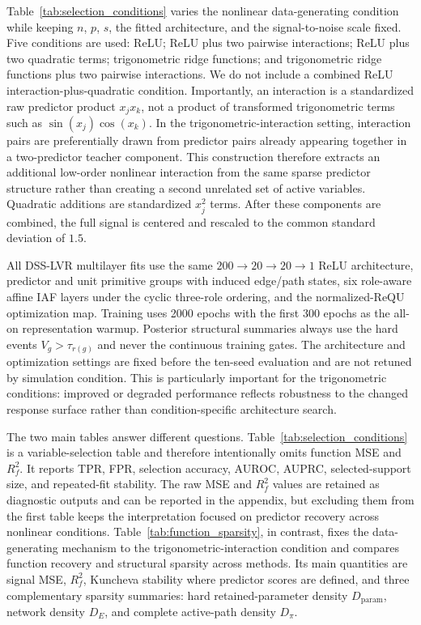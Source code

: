 Table~\ref{tab:selection_conditions} varies the nonlinear data-generating condition while keeping $n$, $p$, $s$, the fitted architecture, and the signal-to-noise scale fixed. Five conditions are used: ReLU; ReLU plus two pairwise interactions; ReLU plus two quadratic terms; trigonometric ridge functions; and trigonometric ridge functions plus two pairwise interactions. We do not include a combined ReLU interaction-plus-quadratic condition. Importantly, an interaction is a standardized raw predictor product $x_jx_k$, not a product of transformed trigonometric terms such as $\sin(x_j)\cos(x_k)$. In the trigonometric-interaction setting, interaction pairs are preferentially drawn from predictor pairs already appearing together in a two-predictor teacher component. This construction therefore extracts an additional low-order nonlinear interaction from the same sparse predictor structure rather than creating a second unrelated set of active variables. Quadratic additions are standardized $x_j^2$ terms. After these components are combined, the full signal is centered and rescaled to the common standard deviation of $1.5$.

All DSS-LVR multilayer fits use the same $200\rightarrow20\rightarrow20\rightarrow1$ ReLU architecture, predictor and unit primitive groups with induced edge/path states, six role-aware affine IAF layers under the cyclic three-role ordering, and the normalized-ReQU optimization map. Training uses 2000 epochs with the first 300 epochs as the all-on representation warmup. Posterior structural summaries always use the hard events $V_g>\tau_{r(g)}$ and never the continuous training gates. The architecture and optimization settings are fixed before the ten-seed evaluation and are not retuned by simulation condition. This is particularly important for the trigonometric conditions: improved or degraded performance reflects robustness to the changed response surface rather than condition-specific architecture search.

The two main tables answer different questions. Table~\ref{tab:selection_conditions} is a variable-selection table and therefore intentionally omits function MSE and $R_f^2$. It reports TPR, FPR, selection accuracy, AUROC, AUPRC, selected-support size, and repeated-fit stability. The raw MSE and $R_f^2$ values are retained as diagnostic outputs and can be reported in the appendix, but excluding them from the first table keeps the interpretation focused on predictor recovery across nonlinear conditions. Table~\ref{tab:function_sparsity}, in contrast, fixes the data-generating mechanism to the trigonometric-interaction condition and compares function recovery and structural sparsity across methods. Its main quantities are signal MSE, $R_f^2$, Kuncheva stability where predictor scores are defined, and three complementary sparsity summaries: hard retained-parameter density $D_{\mathrm{param}}$, network density $D_E$, and complete active-path density $D_\pi$.

